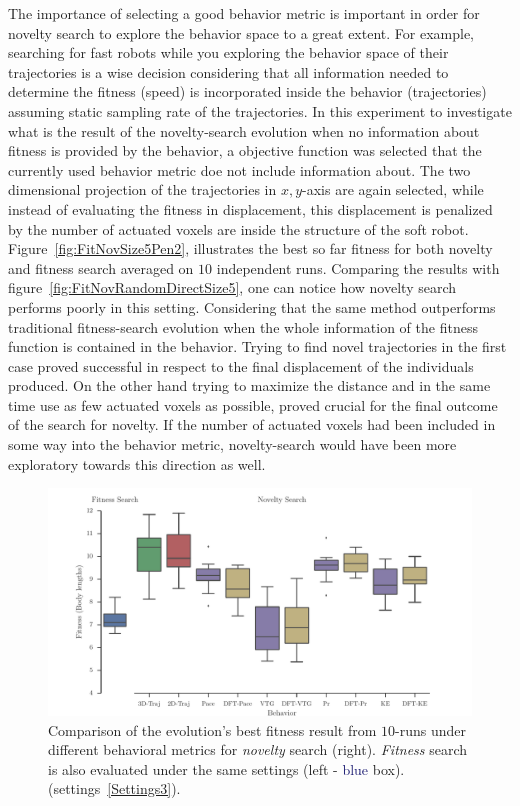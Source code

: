 The importance of selecting a good behavior metric is important in order for novelty search to explore the behavior space to a great extent. For example, searching for fast robots while you exploring the behavior space of their trajectories is a wise decision considering that all information needed to determine the fitness (speed) is incorporated inside the behavior (trajectories) assuming static sampling rate of the trajectories. In this experiment to investigate what is the result of the novelty-search evolution when no information about fitness is provided by the behavior, a objective function was selected that the currently used behavior metric doe not include information about. The two dimensional projection of the trajectories in $x,y$-axis are again selected, while instead of evaluating the fitness in displacement, this displacement is penalized by the number of actuated voxels are inside the structure of the soft robot. Figure~\ref{fig:FitNovSize5Pen2}, illustrates the best so far fitness for both novelty and fitness search averaged on $10$ independent runs. Comparing the results with figure~\ref{fig:FitNovRandomDirectSize5}, one can notice how novelty search performs poorly in this setting. Considering that the same method outperforms traditional fitness-search evolution when the whole information of the fitness function is contained in the behavior. Trying to find novel trajectories in the first case proved successful in respect to the final displacement of the individuals produced. On the other hand trying to maximize the distance and in the same time use as few actuated voxels as possible, proved crucial for the final outcome of the search for novelty. If the number of actuated voxels had been included in some way into the behavior metric, novelty-search would have been more exploratory towards this direction as well.


\begin{figure}[t!]
\centering
\includegraphics[width=1.0\textwidth]{../Figures/Results/BehaviorsPerformance.pdf}
\caption{Comparison of the evolution's best fitness result from $10$-runs under different behavioral metrics for \emph{novelty} search (right). \emph{Fitness} search is also evaluated under the same settings (left - \textcolor{MidnightBlue}{blue} box). (settings~\ref{Settings3}).}
\label{fig:BehaviorsPerformance}
\end{figure}


